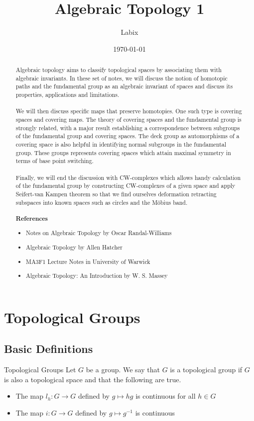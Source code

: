 \documentclass[a4paper]{article}
\title{Algebraic Topology 1}
\author{Labix}
\date{\today}
\begin{document}
\maketitle
\begin{abstract}
Algebraic topology aims to classify topological spaces by associating them with algebraic invariants. In these set of notes, we will discuss the notion of homotopic paths and the fundamental group as an algebraic invariant of spaces and discuss its properties, applications and limitations. \\~\\

We will then discuss specific maps that preserve homotopies. One such type is covering spaces and covering maps. The theory of covering spaces and the fundamental group is strongly related, with a major result establishing a correspondence between subgroups of the fundamental group and covering spaces. The deck group as automorphisms of a covering space is also helpful in identifying normal subgroups in the fundamental group. These groups represents covering spaces which attain maximal symmetry in terms of base point switching. \\~\\

Finally, we will end the discussion with CW-complexes which allows handy calculation of the fundamental group by constructing CW-complexes of a given space and apply Seifert-van Kampen theorem so that we find ourselves deformation retracting subspaces into known spaces such as circles and the Möbius band. \\~\\

\textbf{References}
\begin{itemize}
\item Notes on Algebraic Topology by Oscar Randal-Williams
\item Algebraic Topology by Allen Hatcher
\item MA3F1 Lecture Notes in University of Warwick
\item Algebraic Topology: An Introduction by W. S. Massey
\end{itemize}
\end{abstract}
\pagebreak
\tableofcontents
\pagebreak

\section{Topological Groups}
\subsection{Basic Definitions}
\begin{defn}{Topological Groups}{} Let $G$ be a group. We say that $G$ is a topological group if $G$ is also a topological space and that the following are true. 
\begin{itemize}
\item The map $l_h:G\to G$ defined by $g\mapsto hg$ is continuous for all $h\in G$
\item The map $i:G\to G$ defined by $g\mapsto g^{-1}$ is continuous
\end{itemize}
\end{defn}
\end{document}
